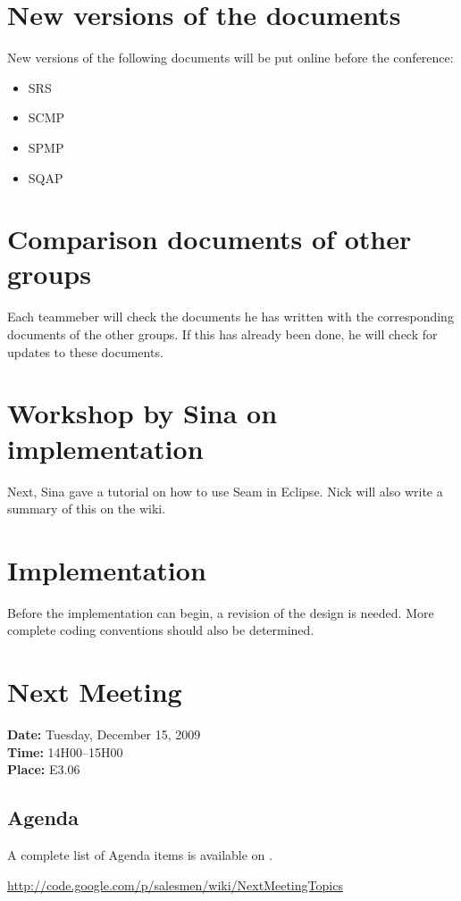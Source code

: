 \documentclass[a4paper, 12pt]{article}
\begin{document}
	\section{New versions of the documents}
New versions of the following documents will be put online before the conference:
		\begin{itemize}
			\item SRS
			\item SCMP
			\item SPMP
			\item SQAP
		\end{itemize}
		
	\section{Comparison documents of other groups}
Each teammeber will check the documents he has written with the corresponding documents of the other groups. If this has already been done, he will check for updates to these documents.

	\section{Workshop by Sina on implementation}
Next, Sina gave a tutorial on how to use Seam in Eclipse. Nick will also write a summary of this on the wiki. 

	\section{Implementation}
Before the implementation can begin, a revision of the design is needed. More complete coding conventions should also be determined.	
	
	\section{Next Meeting}

		\textbf{Date:} Tuesday, December 15, 2009\\
		\textbf{Time:} 14H00--15H00\\
		\textbf{Place:} E3.06\\
	
		\subsection{Agenda}
A complete list of Agenda items is available on \cite{site6}.\\
	
	\begin{thebibliography}{99}
		\href{http://code.google.com/p/salesmen/wiki/NextMeetingTopics}{http://code.google.com/p/salesmen/wiki/NextMeetingTopics}

		
	\end{thebibliography}	
		
\end{document}
